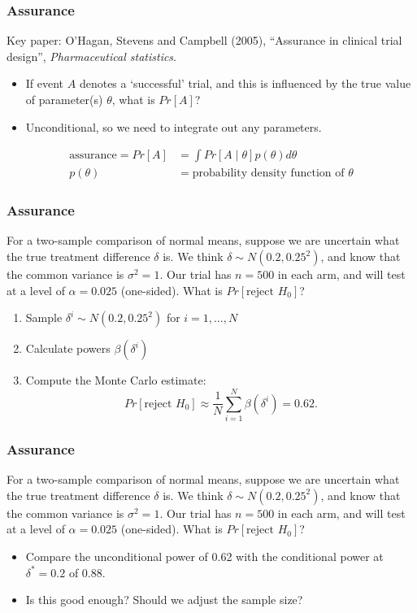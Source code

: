 \documentclass{beamer}
\begin{document}
\frame{\tableofcontents[currentsection]}

\begin{frame}
\frametitle{Assurance}
Key paper: O'Hagan, Stevens and Campbell (2005), ``Assurance in clinical trial design'', \emph{Pharmaceutical statistics}.
\begin{itemize}
\item If event $A$ denotes a `successful' trial, and this is influenced by the true value of parameter(s) $\theta$, what is $Pr[A]$?
\item Unconditional, so we need to integrate out any parameters.
\end{itemize}
\begin{align*}
\text{assurance} = Pr[A] &= \int Pr[A \mid \theta]p(\theta) d\theta \\
 p(\theta) &= \text{probability density function of } \theta
\end{align*}
\end{frame}

\begin{frame}
\frametitle{Assurance}
\begin{example}
For a two-sample comparison of normal means, suppose we are uncertain what the true treatment difference $\delta$ is. We think $\delta \sim N(0.2, 0.25^{2})$, and know that the common variance is $\sigma^{2} = 1$. Our trial has $n = 500$ in each arm, and will test at a level of $\alpha = 0.025$ (one-sided). What is $Pr[\text{reject } H_{0}]$?
\end{example}
\begin{enumerate}
\item Sample $\delta^{i} \sim N(0.2, 0.25^{2})$ for $i = 1, \ldots , N$
\item Calculate powers $\beta(\delta^{i})$
\item{ Compute the Monte Carlo estimate: 
	\begin{equation}
	Pr[\text{reject } H_{0}] \approx \frac{1}{N} \sum_{i=1}^{N} \beta(\delta^{i}) = 0.62.
	\end{equation}}
\end{enumerate}
\end{frame}

\begin{frame}
\frametitle{Assurance}
\begin{example}
For a two-sample comparison of normal means, suppose we are uncertain what the true treatment difference $\delta$ is. We think $\delta \sim N(0.2, 0.25^{2})$, and know that the common variance is $\sigma^{2} = 1$. Our trial has $n = 500$ in each arm, and will test at a level of $\alpha = 0.025$ (one-sided). What is $Pr[\text{reject } H_{0}]$?
\end{example}
\begin{itemize}
\item Compare the unconditional power of 0.62 with the conditional power at $\delta^{*} = 0.2$ of 0.88.
\item Is this good enough? Should we adjust the sample size? 
\end{itemize}
\end{frame}
\end{document}
